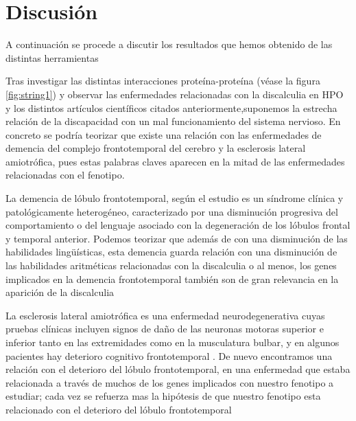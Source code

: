 \newpage

\section{Discusión}

\hfill

A continuación se procede a discutir los resultados que hemos obtenido de las distintas herramientas

\hfill

Tras investigar las distintas interacciones proteína-proteína (véase la figura \ref{fig:string1}) y observar las enfermedades relacionadas con la discalculia en HPO y los distintos artículos científicos citados anteriormente,suponemos la estrecha relación de la discapacidad con un mal funcionamiento del sistema nervioso. En concreto se podría teorizar que existe una relación con las enfermedades de demencia del complejo frontotemporal del cerebro y la esclerosis lateral amiotrófica, pues estas palabras claves aparecen en la mitad de las enfermedades relacionadas con el fenotipo.

\hfill

La demencia de lóbulo frontotemporal, según el estudio \cite{FrontotemoralDementia} es un síndrome clínica y patológicamente heterogéneo, caracterizado por una disminución progresiva del comportamiento o del lenguaje asociado con la degeneración de los lóbulos frontal y temporal anterior. Podemos teorizar que además de con una disminución de las habilidades lingüísticas, esta demencia guarda relación con una disminución de las habilidades aritméticas relacionadas con la discalculia o al menos, los genes implicados en la demencia frontotemporal también son de gran relevancia en la aparición de la discalculia

\hfill

La esclerosis lateral amiotrófica es una enfermedad neurodegenerativa cuyas  pruebas clínicas incluyen signos de daño de las neuronas motoras superior e inferior tanto en las extremidades como en la musculatura bulbar, y en algunos pacientes hay deterioro cognitivo frontotemporal \cite{EsclerosisLateraAmiotrófica}. De nuevo encontramos una relación con el deterioro del lóbulo frontotemporal, en una enfermedad que estaba relacionada a través de muchos de los genes implicados con nuestro fenotipo a estudiar; cada vez se refuerza mas la hipótesis de que nuestro fenotipo esta relacionado con el deterioro del lóbulo frontotemporal

\hfill

